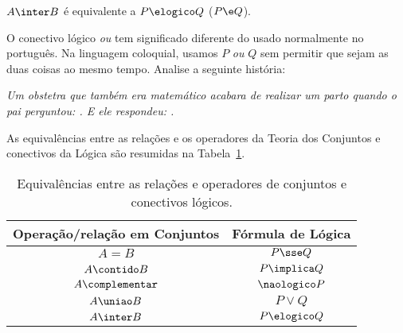 \begin{proposition}
	$A \inter B$ é equivalente a $P \elogico Q$ ($P \e Q$).
\end{proposition}

\begin{remark}
    O conectivo lógico \textit{ou} tem significado diferente do usado normalmente no português. Na linguagem coloquial, usamos $P$ \textit{ou} $Q$ sem permitir que sejam as duas coisas ao mesmo tempo. Analise a seguinte história:

    \emph{Um obstetra que também era matemático acabara de realizar um parto quando o pai perguntou: . E ele respondeu: .}
\end{remark}

As equivalências entre as relações e os operadores da Teoria dos Conjuntos e conectivos da Lógica são resumidas na Tabela~\ref{tbl:equiv-conj-logc}.
\begin{table}[h]
	\centering
    \begin{tabular}{|c|c|}
        \hline
        Operação/relação em Conjuntos & Fórmula de Lógica \\ \hline
        $A = B$                 	  & $P \sse Q$        \\ \hline
        $A \contido B$            	  & $P \implica Q$    \\ \hline
        $A\complementar$        	  & $\naologico P$    \\ \hline
        $A \uniao B$              	  & $P \lor Q$        \\ \hline
        $A \inter B$              	  & $P \elogico Q$    \\
        \hline
    \end{tabular}
	\caption{Equivalências entre as relações e operadores de conjuntos e conectivos lógicos.}
	\label{tbl:equiv-conj-logc}
\end{table}

